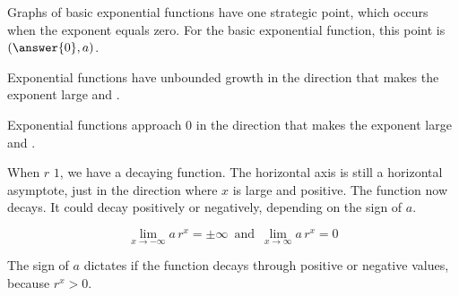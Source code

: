 \documentclass{ximera}
\begin{document}
\begin{explanation}
Graphs of basic exponential functions have one strategic point, which occurs when the exponent equals zero. For the basic exponential function, this point is $\left( \answer{0}, a \right)$.


Exponential functions have unbounded growth in the direction that makes the exponent large and .


Exponential functions approach $0$ in the direction that makes the exponent large and .




\end{explanation}





\begin{explanation}



When $r$ \wordChoice{\choice[correct]{$<$} \choice{$>$}} $1$, we have a decaying function. The horizontal axis is still a horizontal asymptote, just in the direction where $x$ is large and positive. The function now decays. It could decay positively or negatively, depending on the sign of $a$.


\[ \lim_{x \to -\infty} a \, r^x = \pm\infty \, \text{ and } \, \lim_{x \to \infty} a \, r^x = 0 \]


 
The sign of $a$ dictates if the function decays through positive or negative values, because $r^x > 0$.



\begin{image}
\end{image}
\end{explanation}
\end{document}
